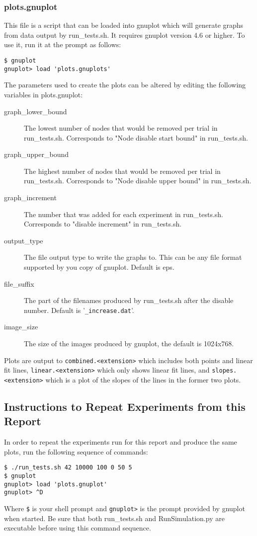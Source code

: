 \documentclass[notitlepage,12pt]{article}
\begin{document}
\subsubsection{plots.gnuplot}
\label{sec:plots}
This file is a script that can be loaded into gnuplot which will generate graphs
from data output by run\_tests.sh. It requires gnuplot version 4.6 or higher. To
use it, run it at the prompt as follows:
\begin{verbatim}
$ gnuplot
gnuplot> load 'plots.gnuplots'
\end{verbatim}
The parameters used to create the plots can be altered by editing the following
variables in plots.gnuplot:
\begin{description}
  \item[graph\_lower\_bound] The lowest number of nodes that would be removed
    per trial in run\_tests.sh. Corresponds to "Node disable start bound" in run\_tests.sh.
  \item[graph\_upper\_bound] The highest number of nodes that would be removed
    per trial in run\_tests.sh. Corresponds to "Node disable upper bound" in run\_tests.sh.
  \item[graph\_increment] The number that was added for each experiment in
    run\_tests.sh. Corresponds to "disable increment" in run\_tests.sh.
  \item[output\_type] The file output type to write the graphs to. This can be
    any file format supported by you copy of gnuplot. Default is eps.
  \item[file\_suffix] The part of the filenames produced by run\_tests.sh after
    the disable number. Default is '\texttt{\_increase.dat}'.
  \item[image\_size] The size of the images produced by gnuplot, the default is 1024x768.
\end{description}

Plots are output to \texttt{combined.<extension>} which includes both points and
linear fit lines, \texttt{linear.<extension>} which only shows linear fit lines,
and \texttt{slopes.<extension>}
which is a plot of the slopes of the lines in the former two plots.

\subsection{Instructions to Repeat Experiments from this Report}
\label{sec:repeatinstr}
In order to repeat the experiments run for this report and produce the same
plots, run the following sequence of commands:
\begin{verbatim}
$ ./run_tests.sh 42 10000 100 0 50 5
$ gnuplot
gnuplot> load 'plots.gnuplot'
gnuplot> ^D
\end{verbatim}
Where
\texttt{\$}
is your shell prompt and
\texttt{gnuplot>}
 is the prompt provided by gnuplot when started. Be sure that both
run\_tests.sh and RunSimulation.py are executable before using this command sequence.
\end{document}
